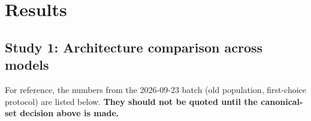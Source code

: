 \section{Results}
\label{sec:results}


\subsection{Study 1: Architecture comparison across models}

For reference, the numbers from the 2026-09-23 batch (old population, first-choice protocol) are listed below. \textbf{They should not be quoted until the canonical-set decision above is made.}

